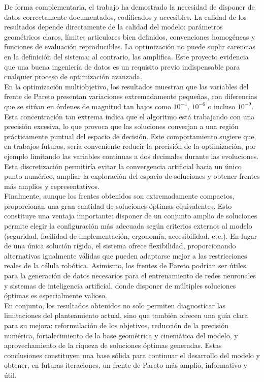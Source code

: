 De forma complementaria, el trabajo ha demostrado la necesidad de disponer de datos correctamente documentados, 
codificados y accesibles. La calidad de los resultados depende directamente de la calidad del modelo: parámetros geométricos 
claros, límites articulares bien definidos, convenciones homogéneas y funciones de evaluación reproducibles. La optimización no 
puede suplir carencias en la definición del sistema; al contrario, las amplifica. Este proyecto evidencia que una buena 
ingeniería de datos es un requisito previo indispensable para cualquier proceso de optimización avanzada. \\

En la optimización multiobjetivo, los resultados muestran que las variables del frente de Pareto presentan variaciones extremadamente pequeñas, con diferencias que 
se sitúan en órdenes de magnitud tan bajos como $10^{-4}$, $10^{-6}$ o incluso $10^{-9}$. Esta concentración tan extrema indica que 
el algoritmo está trabajando con una precisión excesiva, lo que provoca que las soluciones converjan a una región prácticamente 
puntual del espacio de decisión. Este comportamiento sugiere que, en trabajos futuros, sería conveniente reducir la 
precisión de la optimización, por ejemplo limitando las variables continuas a dos decimales durante las evoluciones. Esta 
discretización permitiría evitar la convergencia artificial hacia un único punto numérico, ampliar la exploración del espacio de 
soluciones y obtener frentes más amplios y representativos. \\

Finalmente, aunque los frentes obtenidos son extremadamente compactos, proporcionan una gran cantidad de soluciones 
óptimas equivalentes. Esto constituye una ventaja importante: disponer de un conjunto amplio de soluciones permite
elegir la configuración más adecuada según criterios externos al modelo (seguridad, facilidad de 
implementación, ergonomía, accesibilidad, etc.). En lugar de una única solución rígida, el sistema ofrece flexibilidad, 
proporcionando alternativas igualmente válidas que pueden adaptarse mejor a las restricciones reales de la célula robótica. 
Asimismo, los frentes de Pareto podrían ser útiles para la generación de datos necesarios para el entrenamiento de redes 
neuronales y sistemas de inteligencia artificial, donde disponer de múltiples soluciones óptimas es especialmente valioso. \\

En conjunto, los resultados obtenidos no solo permiten diagnosticar las limitaciones del planteamiento actual, sino que también 
ofrecen una guía clara para su mejora: reformulación de los objetivos, reducción de la precisión numérica, fortalecimiento de la 
base geométrica y cinemática del modelo, y aprovechamiento de la riqueza de soluciones óptimas generadas. Estas conclusiones 
constituyen una base sólida para continuar el desarrollo del modelo y obtener, en futuras iteraciones, un frente de Pareto más 
amplio, informativo y útil.


